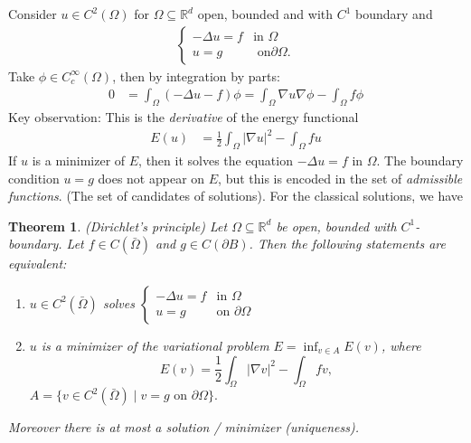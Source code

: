 \documentclass{report}
\theoremstyle{tommy}
\newtheorem{thm}[defn]{Theorem}
\begin{document}
  Consider \(u \in C^2(\Omega)\) for \(\Omega \subseteq \mathbb{R}^d\) open, bounded and with \(C^1\) boundary and \begin{align*}
    \begin{cases}
      - \Delta u = f &\text{in } \Omega \\ u = g &\text{ on} \partial \Omega.
    \end{cases}
  \end{align*}
  Take \(\phi \in C_c^\infty(\Omega)\), then by integration by parts:
  \begin{align*}
    0 &= \int_\Omega(-\Delta u - f) \phi = \int_\Omega \nabla u \nabla \phi - \int_\Omega f \phi
  \end{align*}
  Key observation: This is the \emph{derivative} of the energy functional 
  \begin{align*}
    E(u) &= \frac{1}{2} \int_\Omega|\nabla u|^2 - \int_\Omega f u
  \end{align*}
  If \(u\) is a minimizer of \(E\), then it solves the equation \(-\Delta u = f\) in \(\Omega\). The boundary condition \(u = g\) does not appear on \(E\), but this is encoded in the set of \emph{admissible functions}. (The set of candidates of solutions). For the classical solutions, we have 
  
  \begin{thm}(Dirichlet's principle) Let \(\Omega \subseteq \mathbb{R}^d\) be open, bounded with \(C^1\)-boundary. Let \(f \in C(\bar \Omega)\) and \(g \in C(\partial B)\). Then the following statements are equivalent:
    \begin{enumerate}
        \item \(u \in C^2(\bar \Omega)\) solves \(\begin{cases}
          - \Delta u = f &\text{in } \Omega \\ u = g &\text{on } \partial \Omega
        \end{cases}\)
        \item \(u\) is a minimizer of the variational problem \(E = \inf_{v \in A} E(v)\), where 
        \[E(v) = \frac{1}{2} \int_\Omega |\nabla v|^2 - \int_\Omega f v,\]
        \(A = \{v \in C^2(\bar \Omega) \mid v = g \text{ on } \partial \Omega\}.\)
    \end{enumerate}
    Moreover there is at most a solution / minimizer (uniqueness). 
  \end{thm}
\end{document}
